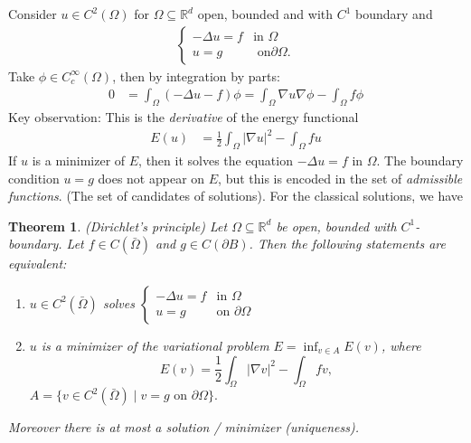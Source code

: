 \documentclass{report}
\theoremstyle{tommy}
\newtheorem{thm}[defn]{Theorem}
\begin{document}
  Consider \(u \in C^2(\Omega)\) for \(\Omega \subseteq \mathbb{R}^d\) open, bounded and with \(C^1\) boundary and \begin{align*}
    \begin{cases}
      - \Delta u = f &\text{in } \Omega \\ u = g &\text{ on} \partial \Omega.
    \end{cases}
  \end{align*}
  Take \(\phi \in C_c^\infty(\Omega)\), then by integration by parts:
  \begin{align*}
    0 &= \int_\Omega(-\Delta u - f) \phi = \int_\Omega \nabla u \nabla \phi - \int_\Omega f \phi
  \end{align*}
  Key observation: This is the \emph{derivative} of the energy functional 
  \begin{align*}
    E(u) &= \frac{1}{2} \int_\Omega|\nabla u|^2 - \int_\Omega f u
  \end{align*}
  If \(u\) is a minimizer of \(E\), then it solves the equation \(-\Delta u = f\) in \(\Omega\). The boundary condition \(u = g\) does not appear on \(E\), but this is encoded in the set of \emph{admissible functions}. (The set of candidates of solutions). For the classical solutions, we have 
  
  \begin{thm}(Dirichlet's principle) Let \(\Omega \subseteq \mathbb{R}^d\) be open, bounded with \(C^1\)-boundary. Let \(f \in C(\bar \Omega)\) and \(g \in C(\partial B)\). Then the following statements are equivalent:
    \begin{enumerate}
        \item \(u \in C^2(\bar \Omega)\) solves \(\begin{cases}
          - \Delta u = f &\text{in } \Omega \\ u = g &\text{on } \partial \Omega
        \end{cases}\)
        \item \(u\) is a minimizer of the variational problem \(E = \inf_{v \in A} E(v)\), where 
        \[E(v) = \frac{1}{2} \int_\Omega |\nabla v|^2 - \int_\Omega f v,\]
        \(A = \{v \in C^2(\bar \Omega) \mid v = g \text{ on } \partial \Omega\}.\)
    \end{enumerate}
    Moreover there is at most a solution / minimizer (uniqueness). 
  \end{thm}
\end{document}
